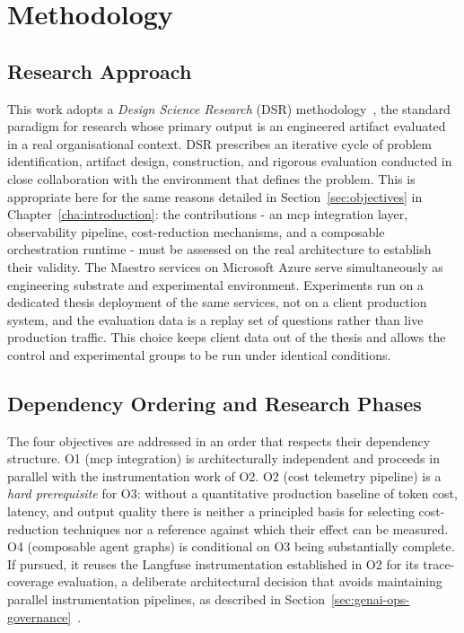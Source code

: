 \section{Methodology}
\label{sec:methodology}

\subsection{Research Approach}
\label{subsec:research-approach}

This work adopts a \textit{Design Science Research} (DSR)
methodology~\cite{hevner2004design}, the standard paradigm for research whose
primary output is an engineered artifact evaluated in a real organisational
context.
DSR prescribes an iterative cycle of problem identification, artifact design,
construction, and rigorous evaluation conducted in close collaboration with the
environment that defines the problem.
This is appropriate here for the same reasons detailed in Section~\ref{sec:objectives} in Chapter~\ref{cha:introduction}: the contributions - an \gls{mcp} integration layer, observability pipeline, cost-reduction mechanisms, and a composable orchestration runtime - must be assessed on the real architecture to establish their validity.
The Maestro services on Microsoft Azure serve simultaneously as engineering
substrate and experimental environment. Experiments run on a dedicated thesis
deployment of the same services, not on a client production system, and the
evaluation data is a replay set of questions rather than live production traffic.
This choice keeps client data out of the thesis and allows the control and
experimental groups to be run under identical conditions.

\subsection{Dependency Ordering and Research Phases}
\label{subsec:phases}

The four objectives are addressed in an order that respects their dependency
structure.
O1 (\gls{mcp} integration) is architecturally independent and proceeds in parallel
with the instrumentation work of O2.
O2 (cost telemetry pipeline) is a \textit{hard prerequisite} for O3: without a
quantitative production baseline of token cost, latency, and output quality
there is neither a principled basis for selecting cost-reduction techniques nor
a reference against which their effect can be measured.
O4 (composable agent graphs) is conditional on O3 being substantially complete.
If pursued, it reuses the Langfuse instrumentation established in
O2 for its trace-coverage evaluation, a deliberate architectural decision that
avoids maintaining parallel instrumentation pipelines, as described in
Section~\ref{sec:genai-ops-governance}~\cite{langfuse2024}.

